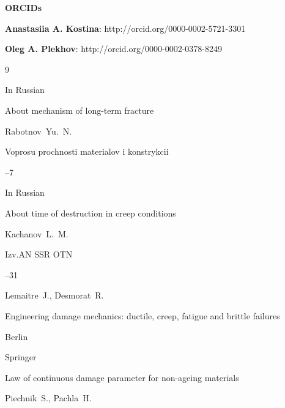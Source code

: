 \makeentitle



\textbf{ORCIDs}



\textbf{Anastasiia A. Kostina}: http://orcid.org/0000-0002-5721-3301



\textbf{Oleg A. Plekhov}: http://orcid.org/0000-0002-0378-8249





\EngRef




\newpage

\begin{thebibliography}{9}




\lang In Russian

\paper About mechanism of  long-term fracture

\by Rabotnov~Yu.~N.

\jour Voprosu prochnosti materialov i konstrykcii


--7 




\lang In Russian

\paper About time of destruction in creep conditions

\by Kachanov~L.~M.

\jour Izv.AN SSR OTN


--31




\by Lemaitre~J., Desmorat~R.

\book Engineering damage mechanics: ductile, creep, fatigue and brittle failures

\publaddr Berlin

\publ Springer






\paper Law of continuous damage parameter for non-ageing materials

\by Piechnik~S., Pachla~H.


\end{thebibliography}

